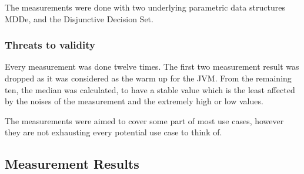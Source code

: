 	The measurements were done with two underlying parametric data structures MDDe, and the  Disjunctive Decision Set.
	
	
		\subsubsection{Threats to validity}
		Every measurement was done twelve times. The first two measurement result was dropped as it was considered as the warm up for the JVM. From the remaining ten, the median was calculated, to have a stable value which is the least affected by the noises of the measurement and the extremely high or low values.
		
		The measurements were aimed to cover some part of most use cases, however they are not exhausting every potential use case to think of.
		
		
	
	\subsection{Measurement Results}
	
		
	
	